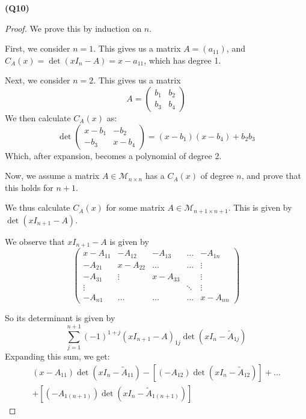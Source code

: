 \documentclass[12pt, a4paper]{article}
\begin{document}
\textbf{(Q10)}
\begin{proof}
    We prove this by induction on $n$.

    First, we consider $n = 1$. This gives us a matrix $A = (a_{11})$, and
    $C_A(x) = \det (xI_n - A) = x - a_{11}$, which has degree 1.

    Next, we consider $n = 2$. This gives us a matrix
    \[
        A = \begin{pmatrix}
            b_1 & b_2\\
            b_3 & b_4
        \end{pmatrix}
    \]
    We then calculate $C_A(x)$ as:
    \[
        \det \begin{pmatrix}
            x - b_1 & -b_2\\
            -b_3 & x - b_4
        \end{pmatrix}
        = (x - b_1)(x - b_4) + b_2b_3
    \]
    Which, after expansion, becomes a polynomial of degree 2.

    Now, we assume a matrix $A \in \mathcal{M}_{n \times n}$ has a
    $C_A(x)$ of degree $n$, and prove that this holds for $n + 1$.

    We thus calculate $C_A(x)$ for some matrix
    $A \in \mathcal{M}_{n + 1 \times n + 1}$. This is given by
    $\det \left(xI_{n + 1} - A\right)$.

    We observe that $xI_{n + 1} - A$ is given by
    \[
        \begin{pmatrix}
            x - A_{11} & -A_{12} & -A_{13} & \ldots & -A_{1n}\\
            -A_{21} & x - A_{22} & \ldots  & \ldots & \vdots\\
            -A_{31} & \vdots & x - A_{33}  &        & \vdots\\
            \vdots  &        &        & \ddots      & \vdots\\
            -A_{n1} & \ldots & \ldots & \ldots  & x - A_{nn}
        \end{pmatrix}
    \]

    So its determinant is given by
    \[
        \sum_{j = 1}^{n + 1} (-1)^{1 + j} (xI_{n + 1} - A)_{1j}
        \det \left(xI_n - \tilde{A}_{1j}\right)
    \]
    Expanding this sum, we get:
    \begin{align*}
        (x - A_{11})\det\left(xI_n - \tilde{A}_{11}\right)
        -\left[(-A_{12})\det\left(xI_n - \tilde{A}_{12}\right)\right]
        + \ldots\\
        + \left[(-A_{1(n + 1)})\det\left(xI_n - \tilde{A}_{1(n + 1)}\right)\right]
    \end{align*}


\end{proof}
\end{document}
